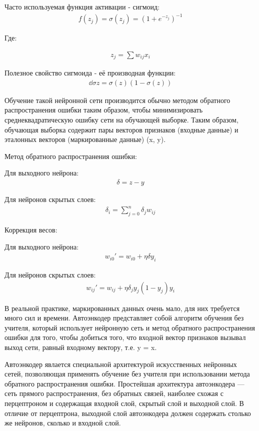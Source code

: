 \documentclass[12pt]{article}
\begin{document}
Часто используемая функция активации - сигмоид:
  \begin{align}
	f(z_j)=\sigma(z_j)=(1+e^{-z_j})^{-1}
  \end{align}

Где:

  \begin{align}
	z_j=\sum{{w_{ij}}{x_i}}
  \end{align}

Полезное свойство сигмоида - её производная функции:
  \begin{align}
	\dd{\sigma}z=\sigma(z)(1-\sigma(z))
  \end{align}

Обучение такой нейронной сети производится обычно методом обратного распространения ошибки таким образом, чтобы минимизировать среднеквадратическую ошибку сети на обучающей выборке. Таким образом, обучающая выборка содержит пары векторов признаков (входные данные) и эталонных векторов (маркированные данные) {(x, y)}.

Метод обратного распространения ошибки:

Для выходного нейрона:
  \begin{align}
	\delta=z-y
  \end{align}

Для нейронов скрытых слоев:
  \begin{align}
	\delta_i=\sum_{j=0}^n \delta_j w_{ij}
  \end{align}

Коррекция весов:

Для выходного нейрона:
  \begin{align}
	w_{i0}'=w_{i0}+\eta\delta y_i
  \end{align}

Для нейронов скрытых слоев:
  \begin{align}
	w_{ij}'=w_{ij}+\eta\delta_j y_j(1-y_j)y_i
  \end{align}

В реальной практике, маркированных данных очень мало, для них требуется много сил и времени. Автоэнкодер представляет собой алгоритм обучения без учителя, который использует нейронную сеть и метод обратного распространения ошибки для того, чтобы добиться того, что входной вектор признаков вызывал выход сети, равный входному вектору, т.е. y = x.

Автоэнкодер явлается специальной архитектурой искусственных нейронных сетей, позволяющая применять обучение без учителя при использовании метода обратного распространения ошибки. Простейшая архитектура автоэнкодера — сеть прямого распространения, без обратных связей, наиболее схожая с перцептроном и содержащая входной слой, скрытый слой и выходной слой. В отличие от перцептрона, выходной слой автоэнкодера должен содержать столько же нейронов, сколько и входной слой.
\end{document}
